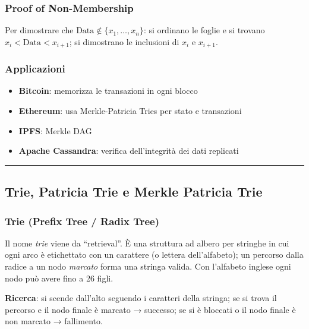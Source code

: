 \documentclass[
  italian,
  openany]{book}
\providecommand{\tightlist}{%
  \setlength{\itemsep}{0pt}\setlength{\parskip}{0pt}}
\begin{document}
\subsubsection{Proof of Non-Membership}\label{proof-of-non-membership}

Per dimostrare che \(\text{Data} \notin \{x_1, \ldots, x_n\}\): si
ordinano le foglie e si trovano \(x_i < \text{Data} < x_{i+1}\); si
dimostrano le inclusioni di \(x_i\) e \(x_{i+1}\).

\subsubsection{Applicazioni}\label{applicazioni-1}

\begin{itemize}
\tightlist
\item
  \textbf{Bitcoin}: memorizza le transazioni in ogni blocco
\item
  \textbf{Ethereum}: usa Merkle-Patricia Tries per stato e transazioni
\item
  \textbf{IPFS}: Merkle DAG
\item
  \textbf{Apache Cassandra}: verifica dell'integrità dei dati replicati
\end{itemize}

\begin{center}\rule{0.5\linewidth}{0.5pt}\end{center}

\subsection{Trie, Patricia Trie e Merkle Patricia
Trie}\label{trie-patricia-trie-e-merkle-patricia-trie}

\subsubsection{Trie (Prefix Tree / Radix
Tree)}\label{trie-prefix-tree-radix-tree}

Il nome \emph{trie} viene da ``retrieval''. È una struttura ad albero
per stringhe in cui ogni arco è etichettato con un carattere (o lettera
dell'alfabeto); un percorso dalla radice a un nodo \emph{marcato} forma
una stringa valida. Con l'alfabeto inglese ogni nodo può avere fino a 26
figli.

\textbf{Ricerca}: si scende dall'alto seguendo i caratteri della
stringa; se si trova il percorso e il nodo finale è marcato → successo;
se si è bloccati o il nodo finale è non marcato → fallimento.
\end{document}

